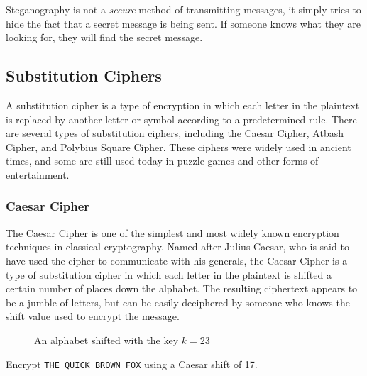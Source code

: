 \documentclass[11pt,a4paper]{report}
\begin{document}
Steganography is not a \emph{secure} method of transmitting messages, it simply tries to hide the fact that a secret message is being sent. If someone knows what they are looking for, they will find the secret message.


\subsection{Substitution Ciphers}

A substitution cipher is a type of encryption in which each letter in the plaintext is replaced by another letter or symbol according to a predetermined rule. There are several types of substitution ciphers, including the Caesar Cipher, Atbash Cipher, and Polybius Square Cipher. These ciphers were widely used in ancient times, and some are still used today in puzzle games and other forms of entertainment.

\subsubsection{Caesar Cipher}
The Caesar Cipher is one of the simplest and most widely known encryption techniques in classical cryptography. Named after Julius Caesar, who is said to have used the cipher to communicate with his generals, the Caesar Cipher is a type of substitution cipher in which each letter in the plaintext is shifted a certain number of places down the alphabet. The resulting ciphertext appears to be a jumble of letters, but can be easily deciphered by someone who knows the shift value used to encrypt the message.  

\begin{figure}[h]
\caption{An alphabet shifted with the key $k=23$}
\end{figure}

\begin{ex}
Encrypt \verb|THE QUICK BROWN FOX| using a Caesar shift of 17.
\end{ex}
\end{document}
